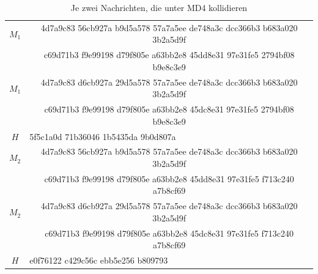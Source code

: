 \documentclass[12pt,a4paper]{scrartcl}
\numberwithin{equation}{section}
\numberwithin{myalgctr}{section}
\numberwithin{mytheoremctr}{section}
\begin{document}
	\begin{table}[h!]
	\begin{tabular}{|c|c|}
		\hline 
		$M_1$ & 4d7a9c83\hfill{} 56cb927a\hfill{}  b9d5a578\hfill{} 57a7a5ee\hfill{} de748a3c\hfill{} dcc366b3\hfill{} b683a020\hfill{} 3b2a5d9f\\
		& c69d71b3\hfill{} f9e99198\hfill{} d79f805e\hfill{} a63bb2e8\hfill{} 45dd8e31\hfill{} 97e31fe5\hfill{} 2794bf08\hfill{} b9e8c3e9\\ 
		\hline 
		$M_1$ & 4d7a9c83\hfill{} d6cb927a\hfill{} 29d5a578\hfill{} 57a7a5ee\hfill{} de748a3c\hfill{} dcc366b3\hfill{} b683a020\hfill{} 3b2a5d9f\\
		& c69d71b3\hfill{} f9e99198\hfill{} d79f805e\hfill{} a63bb2e8\hfill{} 45dc8e31\hfill{} 97e31fe5\hfill{} 2794bf08\hfill{} b9e8c3e9\\ 
		\hline 
		$H$ & \multicolumn{1}{l|}{5f5c1a0d 71b36046 1b5435da 9b0d807a} \\ 
		\hline
		$M_2$ & 4d7a9c83\hfill{} 56cb927a\hfill{} b9d5a578\hfill{} 57a7a5ee\hfill{} de748a3c\hfill{} dcc366b3\hfill{} b683a020\hfill{} 3b2a5d9f\\
		& c69d71b3\hfill{} f9e99198\hfill{} d79f805e\hfill{} a63bb2e8\hfill{} 45dd8e31\hfill{} 97e31fe5\hfill{} f713c240\hfill{} a7b8cf69\\
		\hline 
		$M_2$ & 4d7a9c83\hfill{} d6cb927a\hfill{} 29d5a578\hfill{} 57a7a5ee\hfill{} de748a3c\hfill{} dcc366b3\hfill{} b683a020\hfill{} 3b2a5d9f\\
		& c69d71b3\hfill{} f9e99198\hfill{} d79f805e\hfill{} a63bb2e8\hfill{} 45dc8e31\hfill{} 97e31fe5\hfill{} f713c240\hfill{} a7b8cf69\\
		\hline 
		$H$ & \multicolumn{1}{l|}{e0f76122 c429c56c ebb5e256 b809793} \\ 
		\hline 
	\end{tabular} 
\caption{Je zwei Nachrichten, die unter MD4 kollidieren \autocite[3]{md4Collision}}
\end{table}

	\newpage
\end{document}
